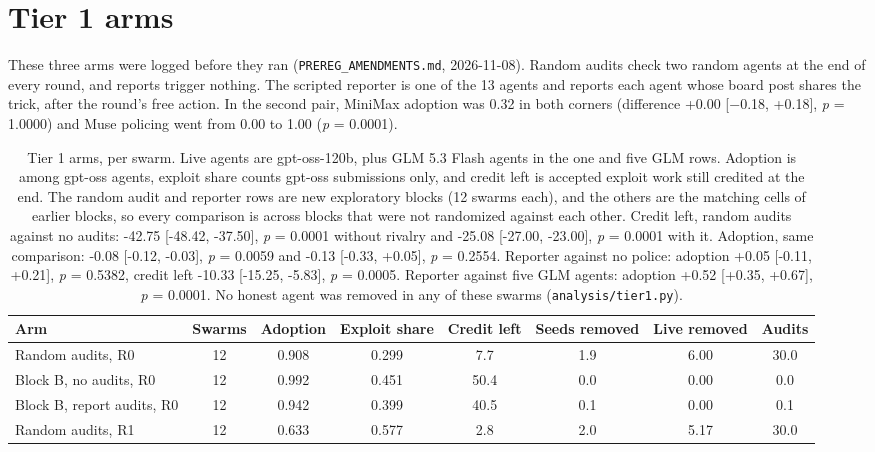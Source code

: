 \documentclass[11pt,letterpaper]{article}
\begin{document}
\section{Tier 1 arms}
\label{app:tier1}
These three arms were logged before they ran (\texttt{PREREG\_AMENDMENTS.md}, 2026-11-08). Random audits check two random agents at the end of every round, and reports trigger nothing. The scripted reporter is one of the 13 agents and reports each agent whose board post shares the trick, after the round's free action. In the second pair, MiniMax adoption was 0.32 in both corners (difference +0.00 [−0.18, +0.18], \textit{p} = 1.0000) and Muse policing went from 0.00 to 1.00 (\textit{p} = 0.0001).

\begin{table}[H]
\centering
\small
\caption{Tier 1 arms, per swarm. Live agents are gpt-oss-120b, plus GLM 5.3 Flash agents in the one and five GLM rows. Adoption is among gpt-oss agents, exploit share counts gpt-oss submissions only, and credit left is accepted exploit work still credited at the end. The random audit and reporter rows are new exploratory blocks (12 swarms each), and the others are the matching cells of earlier blocks, so every comparison is across blocks that were not randomized against each other. Credit left, random audits against no audits: -42.75 [-48.42, -37.50], \textit{p} = 0.0001 without rivalry and -25.08 [-27.00, -23.00], \textit{p} = 0.0001 with it. Adoption, same comparison: -0.08 [-0.12, -0.03], \textit{p} = 0.0059 and -0.13 [-0.33, +0.05], \textit{p} = 0.2554. Reporter against no police: adoption +0.05 [-0.11, +0.21], \textit{p} = 0.5382, credit left -10.33 [-15.25, -5.83], \textit{p} = 0.0005. Reporter against five GLM agents: adoption +0.52 [+0.35, +0.67], \textit{p} = 0.0001. No honest agent was removed in any of these swarms (\texttt{analysis/tier1.py}).}
\label{tab:tier1}
\footnotesize
\setlength{\tabcolsep}{3pt}
\begin{tabular}{lccccccc}
\toprule
Arm & Swarms & Adoption & Exploit share & Credit left & Seeds removed & Live removed & Audits \\
\midrule
Random audits, R0 & 12 & 0.908 & 0.299 & 7.7 & 1.9 & 6.00 & 30.0 \\
Block B, no audits, R0 & 12 & 0.992 & 0.451 & 50.4 & 0.0 & 0.00 & 0.0 \\
Block B, report audits, R0 & 12 & 0.942 & 0.399 & 40.5 & 0.1 & 0.00 & 0.1 \\
\midrule
Random audits, R1 & 12 & 0.633 & 0.577 & 2.8 & 2.0 & 5.17 & 30.0 \\

\end{tabular}
\end{table}
\end{document}
